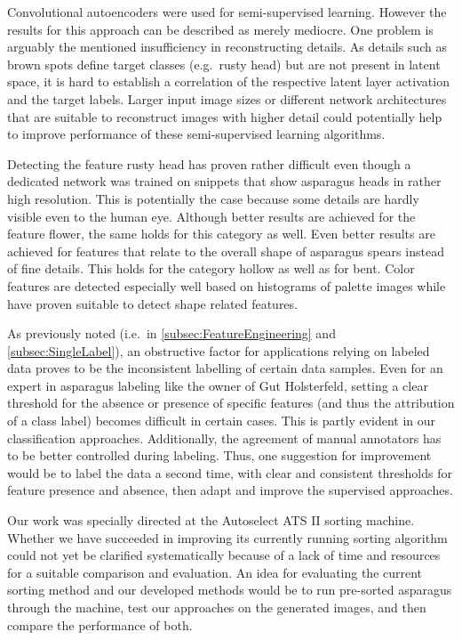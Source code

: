 \bigskip
Convolutional autoencoders were used for semi-supervised learning. However the results for this approach can be described as merely mediocre. One problem is arguably the mentioned insufficiency in reconstructing details. As details such as brown spots define target classes (e.g.\ rusty head) but are not present in latent space, it is hard to establish a correlation of the respective latent layer activation and the target labels. Larger input image sizes or different network architectures that are suitable to reconstruct images with higher detail could potentially help to improve performance of these semi-supervised learning algorithms.

\bigskip
Detecting the feature rusty head has proven rather difficult even though a dedicated network was trained on snippets that show asparagus heads in rather high resolution. This is potentially the case because some details are hardly visible even to the human eye. Although better results are achieved for the feature flower, the same holds for this category as well. Even better results are achieved for features that relate to the overall shape of asparagus spears instead of fine details. This holds for the category hollow as well as for bent. Color features are detected especially well based on histograms of palette images while  have proven suitable to detect shape related features.

As previously noted (i.e.\ in \autoref{subsec:FeatureEngineering} and \autoref{subsec:SingleLabel}), an obstructive factor for applications relying on labeled data proves to be the inconsistent labelling of certain data samples. Even for an expert in asparagus labeling like the owner of Gut Holsterfeld, setting a clear threshold for the absence or presence of specific features (and thus the attribution of a class label) becomes difficult in certain cases. This is partly evident in our classification approaches. Additionally, the agreement of manual annotators has to be better controlled during labeling. Thus, one suggestion for improvement would be to label the data a second time, with clear and consistent thresholds for feature presence and absence, then adapt and improve the supervised approaches.

\bigskip
Our work was specially directed at the Autoselect ATS II sorting machine. Whether we have succeeded in improving its currently running sorting algorithm could not yet be clarified systematically because of a lack of time and resources for a suitable comparison and evaluation. An idea for evaluating the current sorting method and our developed methods would be to run pre-sorted asparagus through the machine, test our approaches on the generated images, and then compare the performance of both.

